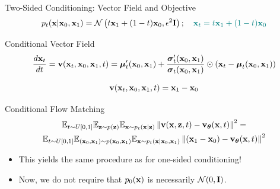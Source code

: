 \documentclass{beamer}
\renewcommand{\eqpause}{}
\begin{document}
\begin{frame}{Two-Sided Conditioning: Vector Field and Objective}
	\vspace{-0.3cm}
	\[
		p_t(\mathbf{x} | \mathbf{x}_0, \mathbf{x}_1) = \mathcal{N}\left(t \mathbf{x}_1 + (1 - t) \mathbf{x}_0, \epsilon^2 \mathbf{I}\right); \quad {\color{teal}\mathbf{x}_t = t \mathbf{x}_1 + (1 - t) \mathbf{x}_0}
	\]
	\vspace{-0.5cm}
	\begin{block}{Conditional Vector Field}
		\vspace{-0.5cm}
		\[
			 \frac{d\mathbf{x}_t}{dt} = \mathbf{v}(\mathbf{x}_t, \mathbf{x}_0, \mathbf{x}_1, t) =  \boldsymbol{\mu}_t'(\mathbf{x}_0, \mathbf{x}_1) + \frac{\boldsymbol{\sigma}_t'(\mathbf{x}_0, \mathbf{x}_1)}{\boldsymbol{\sigma}_t(\mathbf{x}_0, \mathbf{x}_1)} \odot (\mathbf{x}_t - \boldsymbol{\mu}_t(\mathbf{x}_0, \mathbf{x}_1))
		\]
		\eqpause
		\vspace{-0.5cm}
		\[
			\mathbf{v}(\mathbf{x}_t, \mathbf{x}_0, \mathbf{x}_1, t) = \mathbf{x}_1 - \mathbf{x}_0
		\]
		\vspace{-0.7cm}
	\end{block}
	\eqpause
	\begin{block}{Conditional Flow Matching}
		\vspace{-0.7cm}
		\begin{multline*}
			\mathbb{E}_{t \sim U[0, 1]} \mathbb{E}_{\mathbf{z} \sim p(\mathbf{z})} \mathbb{E}_{\mathbf{x} \sim p_t(\mathbf{x} | \mathbf{z})}\left\| \mathbf{v}(\mathbf{x}, \mathbf{z}, t) - \mathbf{v}_{\boldsymbol{\theta}}(\mathbf{x}, t) \right\|^2 = \\
		 \mathbb{E}_{t \sim U[0, 1]} \mathbb{E}_{(\mathbf{x}_0, \mathbf{x}_1) \sim p(\mathbf{x}_0, \mathbf{x}_1)} \mathbb{E}_{\mathbf{x} \sim p_t(\mathbf{x} | \mathbf{x}_0, \mathbf{x}_1)} \left\| (\mathbf{x}_1 - \mathbf{x}_0) - \mathbf{v}_{\boldsymbol{\theta}}(\mathbf{x}, t) \right\|^2
		\end{multline*}
	\end{block}
	\eqpause
	\vspace{-0.3cm}
	\begin{itemize}
		\item This yields the same procedure as for one-sided conditioning!
		\item Now, we do not require that $p_0(\mathbf{x})$ is necessarily $\mathcal{N}(0, \mathbf{I})$.
	\end{itemize} 
\end{frame}
\end{document}
